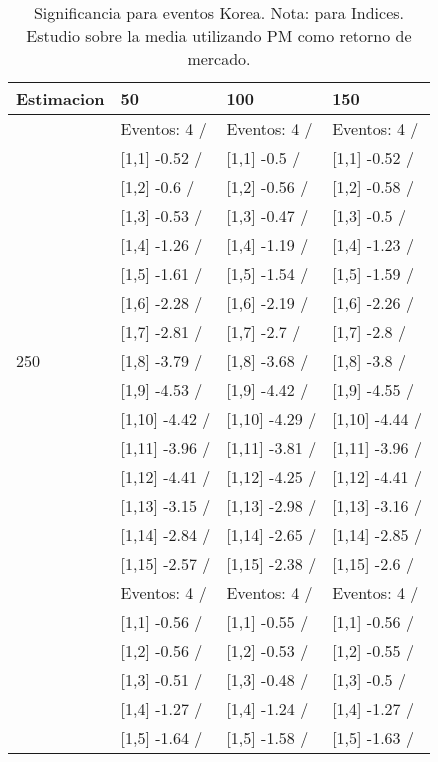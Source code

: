 \begin{table}

\caption{Significancia para eventos Korea. Nota: para Indices. Estudio sobre la media utilizando PM como retorno de mercado.}
\centering
\begin{tabular}[t]{llll}
\toprule
Estimacion & 50 & 100 & 150\\
\midrule
 & Eventos:  4 / & Eventos:  4 / & Eventos:  4 /\\
 & {}[1,1] -0.52  / & {}[1,1] -0.5  / & {}[1,1] -0.52  /\\
 & {}[1,2] -0.6  / & {}[1,2] -0.56  / & {}[1,2] -0.58  /\\
 & {}[1,3] -0.53  / & {}[1,3] -0.47  / & {}[1,3] -0.5  /\\
 & {}[1,4] -1.26  / & {}[1,4] -1.19  / & {}[1,4] -1.23  /\\
\addlinespace
 & {}[1,5] -1.61  / & {}[1,5] -1.54  / & {}[1,5] -1.59  /\\
 & {}[1,6] -2.28  / & {}[1,6] -2.19  / & {}[1,6] -2.26  /\\
 & {}[1,7] -2.81  / & {}[1,7] -2.7  / & {}[1,7] -2.8  /\\
250 & {}[1,8] -3.79  / & {}[1,8] -3.68  / & {}[1,8] -3.8  /\\
 & {}[1,9] -4.53  / & {}[1,9] -4.42  / & {}[1,9] -4.55  /\\
\addlinespace
 & {}[1,10] -4.42  / & {}[1,10] -4.29  / & {}[1,10] -4.44  /\\
 & {}[1,11] -3.96  / & {}[1,11] -3.81  / & {}[1,11] -3.96  /\\
 & {}[1,12] -4.41  / & {}[1,12] -4.25  / & {}[1,12] -4.41  /\\
 & {}[1,13] -3.15  / & {}[1,13] -2.98  / & {}[1,13] -3.16  /\\
 & {}[1,14] -2.84  / & {}[1,14] -2.65  / & {}[1,14] -2.85  /\\
\addlinespace
 & {}[1,15] -2.57  / & {}[1,15] -2.38  / & {}[1,15] -2.6  /\\
 & Eventos:  4 / & Eventos:  4 / & Eventos:  4 /\\
 & {}[1,1] -0.56  / & {}[1,1] -0.55  / & {}[1,1] -0.56  /\\
 & {}[1,2] -0.56  / & {}[1,2] -0.53  / & {}[1,2] -0.55  /\\
 & {}[1,3] -0.51  / & {}[1,3] -0.48  / & {}[1,3] -0.5  /\\
\addlinespace
 & {}[1,4] -1.27  / & {}[1,4] -1.24  / & {}[1,4] -1.27  /\\
 & {}[1,5] -1.64  / & {}[1,5] -1.58  / & {}[1,5] -1.63  /\\

\end{tabular}
\end{table}
